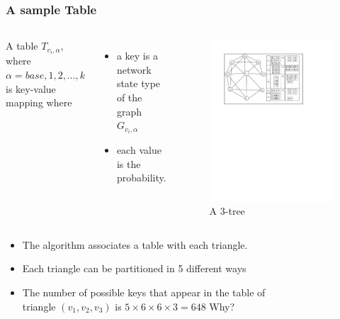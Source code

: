 \documentclass{beamer}
\begin{document}
\begin{frame}
\frametitle{A sample Table}
\vspace{-1.5em}
\begin{columns}
A table $T_{v_i,\alpha}$, where $\alpha=base, 1, 2, \ldots, k$ is key-value mapping where
\begin{itemize}
\item a key is a network state type of the graph $G_{v_i,\alpha}$ 
\item each value is the probability.
\end{itemize}
\begin{figure}[htbp]
\includegraphics[width=2 in, height=1 in]{relay1.pdf}
 \caption{ A $3$-tree}
 \label{fig:3t}
\end{figure}
\end{columns}
\vspace*{-0.5 cm}
\begin{columns}
\begin{example}
\begin{itemize}
\item The algorithm associates a table with each triangle.
\item Each triangle can be partitioned in 5 different ways
\item The number of possible keys that appear in the table of triangle $(v_1,v_2,v_3)$ is $5 \times 6 \times 6 \times 3=648$ Why? 
\end{itemize}
\end{example}
\begin{figure}

\end{figure}
\end{columns}
\end{frame}
\end{document}
